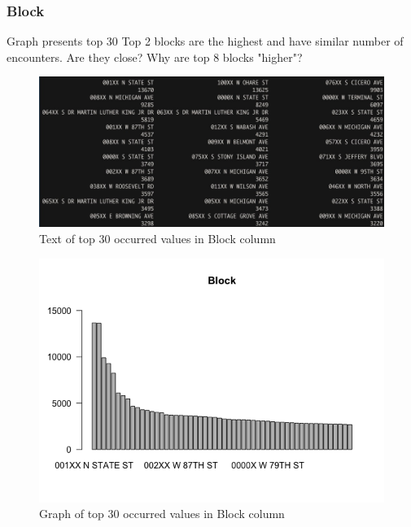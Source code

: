 \newpage
\subsubsection{Block}
Graph presents top 30
Top 2 blocks are the highest and have similar number of encounters. Are they close? Why are top 8 blocks "higher"?
\begin{figure}[H]
\includegraphics[scale=0.4]{images/EDA/Block.jpg}
\centering
\caption{Text of top 30 occurred values in Block column}
\end{figure}
\begin{figure}[H]
\includegraphics[scale=0.7]{images/EDA/Block.png}
\centering
\caption{Graph of top 30 occurred values in Block column}
\end{figure}
